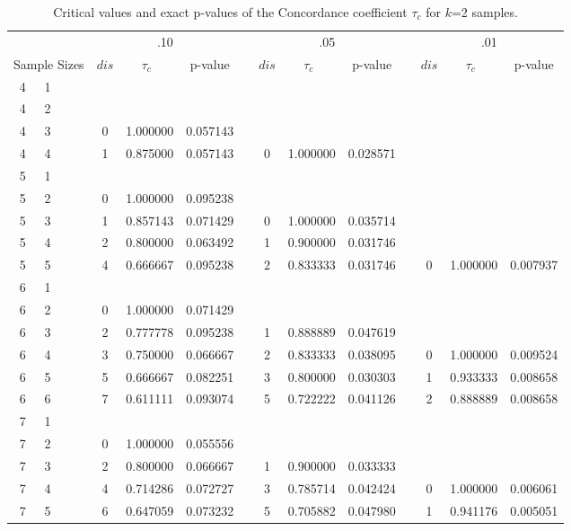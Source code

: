 \begin{appendix}
\begin{longtable}[h]{rrrcccccccccccc}
\caption{Critical values and exact p-values of the Concordance coefficient $\tau_c$ for $k$=2 samples.} 
\endlastfoot

\hline
   & &&  &  \multicolumn{3}{c}{.10} &&  \multicolumn{3}{c}{.05} &&  \multicolumn{3}{c}{.01} \\  \cline{5-7} \cline{9-11} \cline{13-15}
\multicolumn{4}{c}{Sample Sizes} &  $dis$  & $\tau_c$ \, & p-value &&  $dis$  & $\tau_c$ \, & p-value &&  $dis$  & $\tau_c$ \,& p-value \\ \hline

4	&	1	&&&		&		&		&&		&		&		&&		&		&		\\
4	&	2	&&&		&		&		&&		&		&		&&		&		&		\\
4	&	3	&&&	0	&	1.000000	&	0.057143	&&		&		&		&&		&		&		\\
4	&	4	&&&	1	&	0.875000	&	0.057143	&&	0	&	1.000000	&	0.028571	&&		&		&		\\
5	&	1	&&&		&		&		&&		&		&		&&		&		&		\\
5	&	2	&&&	0	&	1.000000	&	0.095238	&&		&		&		&&		&		&		\\
5	&	3	&&&	1	&	0.857143	&	0.071429	&&	0	&	1.000000	&	0.035714	&&		&		&		\\
5	&	4	&&&	2	&	0.800000	&	0.063492	&&	1	&	0.900000	&	0.031746	&&		&		&		\\
5	&	5	&&&	4	&	0.666667	&	0.095238	&&	2	&	0.833333	&	0.031746	&&	0	&	1.000000	&	0.007937	\\
6	&	1	&&&		&		&		&&		&		&		&&		&		&		\\
6	&	2	&&&	0	&	1.000000	&	0.071429	&&		&		&		&&		&		&		\\
6	&	3	&&&	2	&	0.777778	&	0.095238	&&	1	&	0.888889	&	0.047619	&&		&		&		\\
6	&	4	&&&	3	&	0.750000	&	0.066667	&&	2	&	0.833333	&	0.038095	&&	0	&	1.000000	&	0.009524	\\
6	&	5	&&&	5	&	0.666667	&	0.082251	&&	3	&	0.800000	&	0.030303	&&	1	&	0.933333	&	0.008658	\\
6	&	6	&&&	7	&	0.611111	&	0.093074	&&	5	&	0.722222	&	0.041126	&&	2	&	0.888889	&	0.008658	\\
7	&	1	&&&		&		&		&&		&		&		&&		&		&		\\
7	&	2	&&&	0	&	1.000000	&	0.055556	&&		&		&		&&		&		&		\\
7	&	3	&&&	2	&	0.800000	&	0.066667	&&	1	&	0.900000	&	0.033333	&&		&		&		\\
7	&	4	&&&	4	&	0.714286	&	0.072727	&&	3	&	0.785714	&	0.042424	&&	0	&	1.000000	&	0.006061	\\
7	&	5	&&&	6	&	0.647059	&	0.073232	&&	5	&	0.705882	&	0.047980	&&	1	&	0.941176	&	0.005051	\\

\end{longtable}
\end{appendix}
